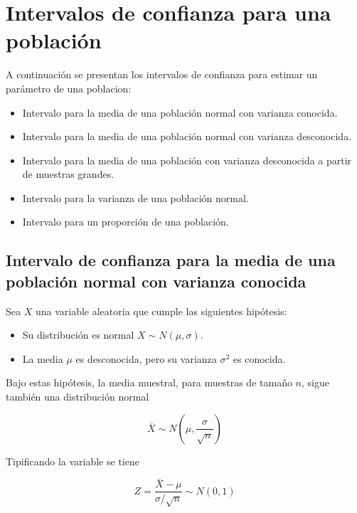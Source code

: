 \documentclass[
  a4paper,
]{scrreport}
\providecommand{\tightlist}{%
  \setlength{\itemsep}{0pt}\setlength{\parskip}{0pt}}\usepackage{longtable,booktabs,array}
\theoremstyle{plain}
\theoremstyle{definition}
\theoremstyle{definition}
\theoremstyle{remark}
\begin{document}
\hypertarget{intervalos-de-confianza-para-una-poblaciuxf3n}{%
\section{Intervalos de confianza para una
población}\label{intervalos-de-confianza-para-una-poblaciuxf3n}}

A continuación se presentan los intervalos de confianza para estimar un
parámetro de una poblacion:

\begin{itemize}
\tightlist
\item
  Intervalo para la media de una población normal con varianza conocida.
\item
  Intervalo para la media de una población normal con varianza
  desconocida.
\item
  Intervalo para la media de una población con varianza desconocida a
  partir de muestras grandes.
\item
  Intervalo para la varianza de una población normal.
\item
  Intervalo para un proporción de una población.
\end{itemize}

\hypertarget{intervalo-de-confianza-para-la-media-de-una-poblaciuxf3n-normal-con-varianza-conocida}{%
\subsection{Intervalo de confianza para la media de una población normal
con varianza
conocida}\label{intervalo-de-confianza-para-la-media-de-una-poblaciuxf3n-normal-con-varianza-conocida}}

Sea \(X\) una variable aleatoria que cumple las siguientes hipótesis:

\begin{itemize}
\tightlist
\item
  Su distribución es normal \(X\sim N(\mu,\sigma)\).
\item
  La media \(\mu\) es desconocida, pero su varianza \(\sigma^2\) es
  conocida.
\end{itemize}

Bajo estas hipótesis, la media muestral, para muestras de tamaño \(n\),
sigue también una distribución normal

\[
\bar X \sim N\left(\mu,\frac{\sigma}{\sqrt n}\right)
\]

Tipificando la variable se tiene

\[
Z=\frac{\bar X-\mu}{\sigma/\sqrt n} \sim N(0,1)
\]
\end{document}
